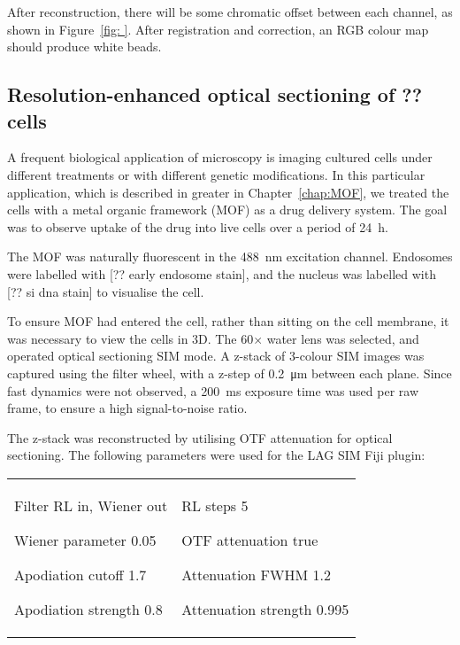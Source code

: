 After reconstruction, there will be some chromatic offset between each channel, as shown in Figure~\ref{fig: }. 
After registration and correction, an RGB colour map should produce white beads. 


\subsection{Resolution-enhanced optical sectioning of ?? cells}
A frequent biological application of microscopy is imaging cultured cells under different treatments or with different genetic modifications. 
In this particular application, which is described in greater in Chapter~\ref{chap:MOF}, we treated the cells with a metal organic framework (MOF) as a drug delivery system. 
The goal was to observe uptake of the drug into live cells over a period of \SI{24}{\hour}. 

The MOF was naturally fluorescent in the \SI{488}{\nano\metre} excitation channel. 
Endosomes were labelled with [?? early endosome stain], and the nucleus was labelled with [?? si dna stain] to visualise the cell. 

To ensure MOF had entered the cell, rather than sitting on the cell membrane, it was necessary to view the cells in 3D. 
The 60$\times$ water lens was selected, and operated optical sectioning SIM mode. 
A z-stack of 3-colour SIM images was captured using the filter wheel, with a z-step of \SI{0.2}{\micro\metre} between each plane. 
Since fast dynamics were not observed, a \SI{200}{\milli\second} exposure time was used per raw frame, to ensure a high signal-to-noise ratio. 

The z-stack was reconstructed by utilising OTF attenuation for optical sectioning. 
The following parameters were used for the LAG SIM Fiji plugin:\newline
\begin{tabular}{p{}p{}}
\begin{labelling}[margin={Attenuation strength}]
	\item[Filter] RL in, Wiener out
	\item[Wiener parameter] 0.05
	\item[Apodiation cutoff] 1.7
	\item[Apodiation strength] 0.8
\end{labelling} &
\begin{labelling}[margin={Attenuation strength}]
	\item[RL steps] 5
	\item[OTF attenuation] true
	\item[Attenuation FWHM] 1.2
	\item[Attenuation strength] 0.995 
\end{labelling} %
\end{tabular}

